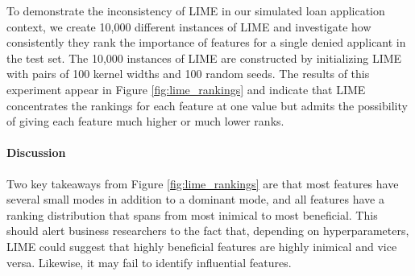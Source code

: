 \documentclass[11pt]{article}    %
\begin{document}
             To demonstrate the inconsistency of LIME  in our simulated loan application context, we create 10,000 different instances of LIME and investigate how consistently they rank the importance of features for a single denied applicant in the test set. The 10,000 instances of LIME are constructed by initializing LIME with pairs of 100 kernel widths and 100 random seeds. The results of this experiment appear in Figure \ref{fig:lime_rankings} and indicate that LIME concentrates the rankings for each feature at one value but admits the possibility of giving each feature much higher or much lower ranks.

             \paragraph{Discussion}
             Two key takeaways from Figure \ref{fig:lime_rankings} are that most features have several small modes in addition to a dominant mode, and all features have a ranking distribution that spans from most inimical to most beneficial. This should alert business researchers to the fact that, depending on hyperparameters, LIME could suggest that highly beneficial features are highly inimical and vice versa. Likewise, it may fail to identify influential features.

            

\end{document}
